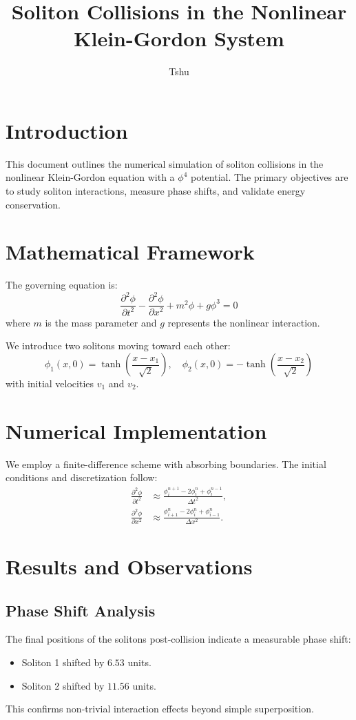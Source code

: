 \documentclass{article}
\title{Soliton Collisions in the Nonlinear Klein-Gordon System}
\author{Tshu}
\date{}
\begin{document}
\maketitle

\section{Introduction}
This document outlines the numerical simulation of soliton collisions in the nonlinear Klein-Gordon equation with a $\phi^4$ potential. The primary objectives are to study soliton interactions, measure phase shifts, and validate energy conservation.

\section{Mathematical Framework}
The governing equation is:
\begin{equation}
\frac{\partial^2 \phi}{\partial t^2} - \frac{\partial^2 \phi}{\partial x^2} + m^2 \phi + g \phi^3 = 0
\end{equation}
where $m$ is the mass parameter and $g$ represents the nonlinear interaction.

We introduce two solitons moving toward each other:
\begin{equation}
\phi_1(x, 0) = \tanh\left(\frac{x - x_1}{\sqrt{2}}\right), \quad 
\phi_2(x, 0) = -\tanh\left(\frac{x - x_2}{\sqrt{2}}\right)
\end{equation}
with initial velocities $v_1$ and $v_2$.

\section{Numerical Implementation}
We employ a finite-difference scheme with absorbing boundaries. The initial conditions and discretization follow:
\begin{align}
\frac{\partial^2 \phi}{\partial t^2} &\approx \frac{\phi^{n+1}_i - 2\phi^n_i + \phi^{n-1}_i}{\Delta t^2}, \\
\frac{\partial^2 \phi}{\partial x^2} &\approx \frac{\phi^n_{i+1} - 2\phi^n_i + \phi^n_{i-1}}{\Delta x^2}.
\end{align}

\section{Results and Observations}
\subsection{Phase Shift Analysis}
The final positions of the solitons post-collision indicate a measurable phase shift:
\begin{itemize}
    \item Soliton 1 shifted by $6.53$ units.
    \item Soliton 2 shifted by $11.56$ units.
\end{itemize}
This confirms non-trivial interaction effects beyond simple superposition.
\end{document}
